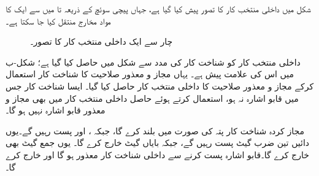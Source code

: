 شکل  میں داخلی منتخب کار کا تصور پیش کیا گیا ہے، جہاں پیچی سوئچ کے ذریعہ  تا  میں سے ایک کا مواد مخارج منتقل کیا جا سکتا ہے۔
\begin{figure}
\centering
{}
\caption{چار سے ایک داخلی منتخب کار کا تصور۔}
\label{شکل_ترکیبی_چار_سے_ایک_داخلی_منتخب_کار_تصور}
\end{figure}

داخلی منتخب کار کو شناخت کار کی مدد سے شکل  میں حاصل کیا گیا ہے؛ شکل-ب میں اس کی علامت پیش ہے۔ یہاں مجاز و معذور صلاحیت کا شناخت کار استعمال کرکے مجاز و معذور صلاحیت کا داخلی منتخب کار حاصل کیا گیا۔ ایسا شناخت کار جس میں قابو اشارہ نہ ہو، استعمال کرتے ہوئے حاصل داخلی منتخب کار میں بھی مجاز و معذور قابو اشارہ نہیں ہو گا۔

مجاز کردہ شناخت کار  پتہ کی صورت میں  بلند کرے گا، جبکہ ،  اور  پست رہیں گے۔یوں دائیں تین ضرب گیٹ پست رہیں گے، جبکہ بایاں گیٹ  خارج کرے گا۔ یوں جمع گیٹ بھی  خارج کرے گا۔قابو اشارہ  پست کرنے سے داخلی شناخت کار معذور ہو گا اور  خارج کرے گا۔

